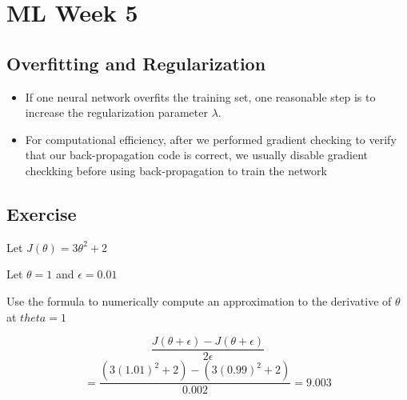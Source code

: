 \documentclass[11pt]{article} %
\begin{document}

\section{ML Week 5}
\subsection*{Overfitting and Regularization}

\begin{itemize}
\item If one neural network overfits the training set, one reasonable step is to
increase the regularization parameter $\lambda$.
\item For computational efficiency, after we performed gradient checking to verify that our back-propagation 
code is correct, we usually disable gradient checkking before using back-propagation to train
the network
\end{itemize}

\subsection*{Exercise}
Let $ J(\theta) = 3\theta^2 + 2$

Let $\theta = 1$ and $\epsilon = 0.01$

Use the formula to numerically compute an approximation to the derivative of $\theta$
at $theta = 1$

\[
\frac{J(\theta + \epsilon) - J(\theta + \epsilon)}{2\epsilon} 
\]
\[
= \frac{(3(1.01)^2 + 2) - (3(0.99)^2 + 2)}{0.002} 
= 9.003
\]
\end{document}
